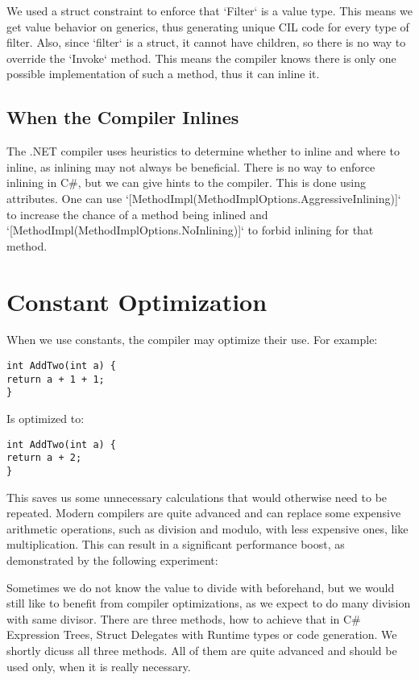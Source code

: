 We used a struct constraint to enforce that `Filter` is a value type. This means we get value behavior on generics, thus generating unique CIL code for every type of filter. Also, since `filter` is a struct, it cannot have children, so there is no way to override the `Invoke` method. This means the compiler knows there is only one possible implementation of such a method, thus it can inline it.

\subsection{When the Compiler Inlines}
The .NET compiler uses heuristics to determine whether to inline and where to inline, as inlining may not always be beneficial. There is no way to enforce inlining in C\#, but we can give hints to the compiler. This is done using attributes. One can use `[MethodImpl(MethodImplOptions.AggressiveInlining)]` to increase the chance of a method being inlined and `[MethodImpl(MethodImplOptions.NoInlining)]` to forbid inlining for that method.

\section{Constant Optimization}
When we use constants, the compiler may optimize their use. For example:

\begin{lstlisting}
int AddTwo(int a) {
return a + 1 + 1;
}
\end{lstlisting}

Is optimized to:

\begin{lstlisting}
int AddTwo(int a) {
return a + 2;
}
\end{lstlisting}

This saves us some unnecessary calculations that would otherwise need to be repeated. Modern compilers are quite advanced and can replace some expensive arithmetic operations, such as division and modulo, with less expensive ones, like multiplication. This can result in a significant performance boost, as demonstrated by the following experiment:

Sometimes we do not know the value to divide with beforehand, but we would still like to benefit from compiler optimizations, as we expect to do many division with same divisor. There are three methods, how to achieve that in C\# Expression Trees, Struct Delegates with Runtime types or code generation. We shortly dicuss all three methods. All of them are quite advanced and should be used only, when it is really necessary.

